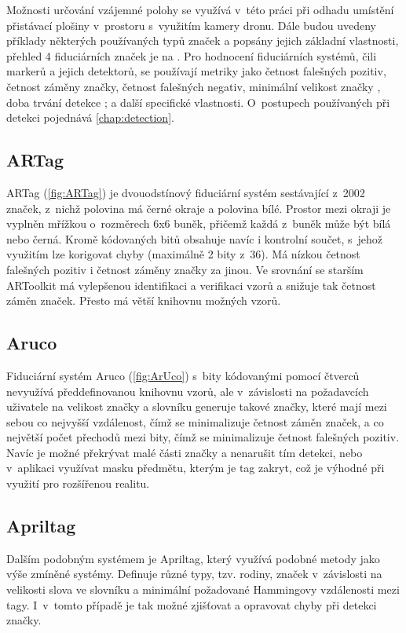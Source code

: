     Možnosti určování vzájemné polohy se využívá v~této práci při odhadu umístění přistávací plošiny v~prostoru s~využitím kamery dronu. Dále budou uvedeny příklady některých používaných typů značek a popsány jejich základní vlastnosti, přehled 4 fiduciárních značek je na . Pro hodnocení fiduciárních systémů, čili markerů a jejich detektorů, se používají metriky jako četnost falešných pozitiv, četnost záměny značky, četnost falešných negativ, minimální velikost značky \cite{artag}, doba trvání detekce \cite{aruco}; \cite{apriltag2} a další specifické vlastnosti. O~postupech používaných při detekci pojednává \cref{chap:detection}.
    \subsection{ARTag}
      ARTag (\cref{fig:ARTag}) je dvouodstínový fiduciární systém sestávající z~2002 značek, z~nichž polovina má černé okraje a polovina bílé. Prostor mezi okraji je vyplněn mřížkou o~rozměrech 6x6 buněk, přičemž každá z~buněk může být bílá nebo černá. Kromě kódovaných bitů obsahuje navíc i kontrolní součet, s~jehož využitím lze korigovat chyby (maximálně 2 bity z~36). Má nízkou četnost falešných pozitiv i četnost záměny značky za jinou. Ve srovnání se starším ARToolkit má vylepšenou identifikaci a verifikaci vzorů a snižuje tak četnost záměn značek. Přesto má větší knihovnu možných vzorů. \cite{artag}
    \subsection{Aruco}
      Fiduciární systém Aruco (\cref{fig:ArUco}) s~bity kódovanými pomocí čtverců nevyužívá předdefinovanou knihovnu vzorů, ale v~závislosti na požadavcích uživatele na velikost značky a slovníku generuje takové značky, které mají mezi sebou co nejvyšší vzdálenost, čímž se minimalizuje četnost záměn značek, a co největší počet přechodů mezi bity, čímž se minimalizuje četnost falešných pozitiv. Navíc je možné překrývat malé části značky a nenarušit tím detekci, nebo v~aplikaci využívat masku předmětu, kterým je tag zakryt, což je výhodné při využití pro rozšířenou realitu. \cite{aruco}
    \subsection{Apriltag}
      Dalším podobným systémem je Apriltag, který využívá podobné metody jako výše zmíněné systémy. Definuje různé typy, tzv. rodiny, značek v~závislosti na velikosti slova ve slovníku a minimální požadované Hammingovy vzdálenosti mezi tagy. I~v~tomto případě je tak možné zjišťovat a opravovat chyby při detekci značky. \cite{apriltag2}
      
